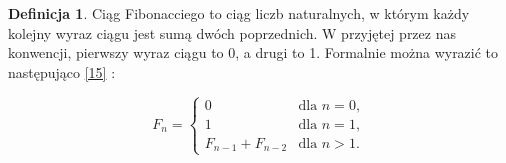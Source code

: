 \documentclass[12pt,a4paper,twoside, inzynierska]{pwr_wmat_praca_dyplomowa}
\theoremstyle{plain}
\numberwithin{theorem}{chapter}
\theoremstyle{definition}
\numberwithin{theorem}{chapter}
\newtheorem{definition}[theorem]{Definicja}
\begin{document}
	\begin{definition}  
		Ciąg Fibonacciego to ciąg liczb naturalnych, w którym każdy kolejny wyraz ciągu jest sumą dwóch poprzednich. W przyjętej przez nas konwencji, pierwszy wyraz ciągu to 0, a drugi to 1. Formalnie można wyrazić to następująco \hyperref[info15]{[15]} :
	\end{definition}
	\vspace{12pt}
	\begin{equation}
		F_n = 
		\begin{cases} 
			0 & \text{dla } n = 0, \\
			1 & \text{dla } n = 1, \\
			F_{n-1} + F_{n-2} & \text{dla } n > 1.
		\end{cases}
	\label{eq:Fib}
	\end{equation}
	\vspace{12pt}
	
\end{document}
